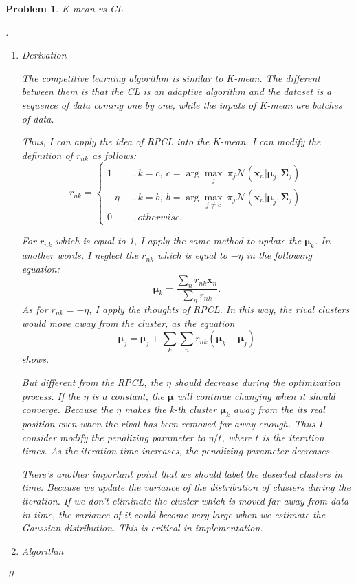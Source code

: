 \documentclass[12pt]{article}
\newtheorem{hw}{Problem}
\newenvironment{sol}
  {\par\vspace{3mm}\noindent{\it Solution}.}
  {\qed}
\newcommand{\argmax}{\arg\!\max}
\newcommand{\xv}{\boldsymbol{x}}
\newcommand{\Sigmamat}{\boldsymbol{\Sigma}}
\newcommand{\muv}{\boldsymbol{\mu}}
\begin{document}
\begin{hw}
K-mean vs CL
\begin{sol}
	\begin{enumerate}
		\item[(1)]{ 
			Derivation
			
			The competitive learning algorithm is similar to K-mean. The different between them is that the CL is an adaptive algorithm and the dataset is a sequence of data coming one by one, while the inputs of K-mean are batches of data.
			
			Thus, I can apply the idea of RPCL into the K-mean. I can modify the definition of $r_{nk}$ as follows:
			$$
				r_{nk} = \left\{
				\begin{aligned}
				1&~~~,k=c,~c = \argmax_j~\pi_j\mathcal{N}(\xv_n|\muv_j,\Sigmamat_j)\\
				-\eta&~~~,k=b,~b=\argmax_{j\ne c}~\pi_j\mathcal{N}(\xv_n|\muv_j,\Sigmamat_j)\\
				0&~~~,otherwise.
				\end{aligned}
				\right.
			$$
			
			For $r_{nk}$ which is equal to 1, I apply the same method to update the $\muv_k$. In another words, I neglect the $r_{nk}$ which is equal to $-\eta$ in the following equation:
			$$\muv_k = \frac{\sum_{n}r_{nk}\xv_n}{\sum_{n}r_{nk}}.$$
			As for $r_{nk}=-\eta$, I apply the thoughts of RPCL. In this way, the rival clusters would move away from the cluster, as the equation
			$$\muv_j = \muv_j + \sum_{k}\sum_{n}r_{nk}(\muv_k-\muv_j)$$
			shows.
			
			But different from the RPCL, the $\eta$ should decrease during the optimization process. If the $\eta$ is a constant, the $\muv$ will continue changing when it should converge. Because the $\eta$ makes the k-th cluster $\muv_k$ away from the its real position even when the rival has been removed far away enough. Thus I consider modify the penalizing parameter to $\eta/t$, where $t$ is the iteration times. As the iteration time increases, the penalizing parameter decreases. 
			
			There's another important point that we should label the deserted clusters in time. Because we update the variance of the distribution of clusters during the iteration. If we don't eliminate the cluster which is moved far away from data in time, the variance of it could become very large when we estimate the Gaussian distribution. This is critical in implementation. 
		}
		\item[(2)]{
			Algorithm
		
}
\end{enumerate}
\end{sol}
\end{hw}
\end{document}
